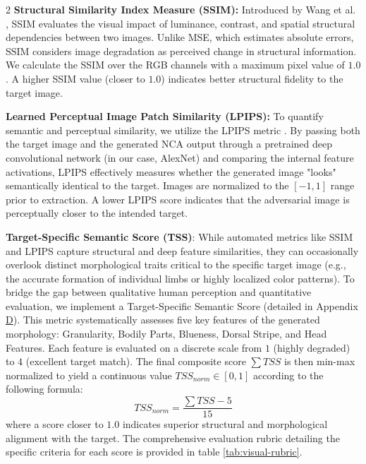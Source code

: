 \documentclass{article}
\begin{document}
\begin{multicols}{2}
\textbf{Structural Similarity Index Measure (SSIM):} Introduced by Wang et al. \cite{wang2004image}, SSIM evaluates the visual impact of luminance, contrast, and spatial structural dependencies between two images. Unlike MSE, which estimates absolute errors, SSIM considers image degradation as perceived change in structural information. We calculate the SSIM over the RGB channels with a maximum pixel value of $1.0$. A higher SSIM value (closer to $1.0$) indicates better structural fidelity to the target image.

\textbf{Learned Perceptual Image Patch Similarity (LPIPS):} To quantify semantic and perceptual similarity, we utilize the LPIPS metric \cite{zhang2018unreasonable}. By passing both the target image and the generated NCA output through a pretrained deep convolutional network (in our case, AlexNet) and comparing the internal feature activations, LPIPS effectively measures whether the generated image "looks" semantically identical to the target. Images are normalized to the $[-1, 1]$ range prior to extraction. A lower LPIPS score indicates that the adversarial image is perceptually closer to the intended target.

\textbf{Target-Specific Semantic Score (TSS)}: While automated metrics like SSIM and LPIPS capture structural and deep feature similarities, they can occasionally overlook distinct morphological traits critical to the specific target image (e.g., the accurate formation of individual limbs or highly localized color patterns). To bridge the gap between qualitative human perception and quantitative evaluation, we implement a Target-Specific Semantic Score (detailed in Appendix \hyperref[appendix:d]{D}). This metric systematically assesses five key features of the generated morphology: Granularity, Bodily Parts, Blueness, Dorsal Stripe, and Head Features. 
Each feature is evaluated on a discrete scale from $1$ (highly degraded) to $4$ (excellent target match). The final composite score $\sum TSS$ is then min-max normalized to yield a continuous value $TSS_{norm} \in [0, 1]$ according to the following formula:$$TSS_{norm} = \frac{\sum TSS - 5}{15}$$where a score closer to $1.0$ indicates superior structural and morphological alignment with the target. The comprehensive evaluation rubric detailing the specific criteria for each score is provided in table \ref{tab:visual-rubric}.


\end{multicols}
\end{document}
